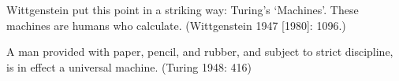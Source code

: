 

Wittgenstein put this point in a striking way:
Turing’s ‘Machines’. These machines are humans who calculate. (Wittgenstein 1947 [1980]: 1096.)


A man provided with paper, pencil, and rubber, and subject to strict discipline, is in effect a universal machine. (Turing 1948: 416)


